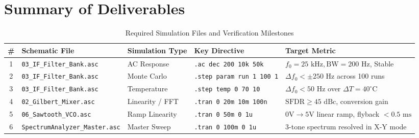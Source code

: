 \documentclass[11pt,a4paper]{article}
\begin{document}
\section{Summary of Deliverables}

\begin{table}[h!]
\centering
\small
\begin{tabularx}{\textwidth}{clllX}
\toprule
\textbf{\#} & \textbf{Schematic File} & \textbf{Simulation Type} & \textbf{Key Directive} & \textbf{Target Metric} \\
\midrule
1 & \texttt{03\_IF\_Filter\_Bank.asc} & AC Response & \texttt{.ac dec 200 10k 50k} & $f_0 = 25\text{ kHz}, \text{BW} = 200\text{ Hz}$, Stable \\
2 & \texttt{03\_IF\_Filter\_Bank.asc} & Monte Carlo & \texttt{.step param run 1 100 1} & $\Delta f_0 < \pm 250\text{ Hz}$ across 100 runs \\
3 & \texttt{03\_IF\_Filter\_Bank.asc} & Temperature & \texttt{.step temp 0 70 10} & $\Delta f_0 < 50\text{ Hz}$ over $\Delta T = 40^\circ\text{C}$ \\
4 & \texttt{02\_Gilbert\_Mixer.asc} & Linearity / FFT & \texttt{.tran 0 20m 10m 100n} & $\text{SFDR} \ge 45\text{ dBc}$, conversion gain \\
5 & \texttt{06\_Sawtooth\_VCO.asc} & Ramp Linearity & \texttt{.tran 0 50m 0 1u} & $0\text{V} \to 5\text{V}$ linear ramp, flyback $< 0.5\text{ ms}$ \\
6 & \texttt{SpectrumAnalyzer\_Master.asc} & Master Sweep & \texttt{.tran 0 100m 0 1u} & 3-tone spectrum resolved in X-Y mode \\
\bottomrule
\end{tabularx}
\caption{Required Simulation Files and Verification Milestones}
\end{table}
\end{document}
